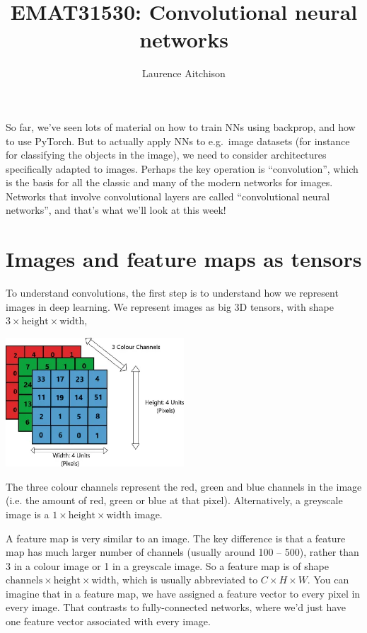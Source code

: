 \documentclass{article}
\title{EMAT31530: Convolutional neural networks}
\author{Laurence Aitchison}
\date{}
\begin{document}
\maketitle

So far, we've seen lots of material on how to train NNs using backprop, and how to use PyTorch.
But to actually apply NNs to e.g.\ image datasets (for instance for classifying the objects in the image), we need to consider architectures specifically adapted to images.
Perhaps the key operation is ``convolution'', which is the basis for all the classic and many of the modern networks for images.
Networks that involve convolutional layers are called ``convolutional neural networks'', and that's what we'll look at this week!


\section{Images and feature maps as tensors}

To understand convolutions, the first step is to understand how we represent images in deep learning.
We represent images as big 3D tensors, with shape $3 \times \text{height} \times \text{width}$,

\begin{center}
  \includegraphics[width=0.5\textwidth]{image_as_tensor.png}
\end{center}

The three colour channels represent the red, green and blue channels in the image (i.e. the amount of red, green or blue at that pixel).
Alternatively, a greyscale image is a $1 \times \text{height} \times \text{width}$ image.

A feature map is very similar to an image. 
The key difference is that a feature map has much larger number of channels (usually around 100 -- 500), rather than 3 in a colour image or 1 in a greyscale image.
So a feature map is of shape $\text{channels} \times \text{height} \times \text{width}$, which is usually abbreviated to $C\times H \times W$.
You can imagine that in a feature map, we have assigned a feature vector to every pixel in every image.
That contrasts to fully-connected networks, where we'd just have one feature vector associated with every image.
\end{document}
